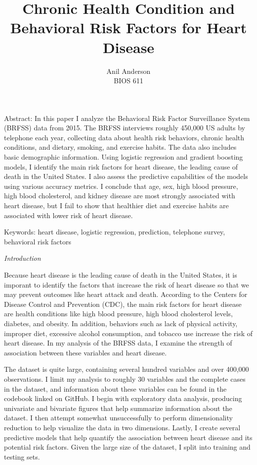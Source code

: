 \documentclass[12pt]{article}
\begin{document}
 
\title{Chronic Health Condition and Behavioral Risk Factors for Heart Disease}
\author{Anil Anderson\\
BIOS 611}
 
\maketitle

\noindent Abstract: In this paper I analyze the Behavioral Risk Factor Surveillance System (BRFSS) data from 2015. The BRFSS interviews roughly 450,000 US adults by telephone each year, collecting data about health risk behaviors, chronic health conditions, and dietary, smoking, and exercise habits. The data also includes basic demographic information. Using logistic regression and gradient boosting models, I identify the main risk factors for heart disease, the leading cause of death in the United States. I also assess the predictive capabilities of the models using various accuracy metrics. I conclude that age, sex, high blood pressure, high blood cholesterol, and kidney disease are most strongly associated with heart disease, but I fail to show that healthier diet and exercise habits are associated with lower risk of heart disease.

\medskip
\noindent Keywords: heart disease, logistic regression, prediction, telephone survey, behavioral risk factors
\medskip

\bigskip
\noindent \textit{Introduction}
\medskip

Because heart disease is the leading cause of death in the United States, it is imporant to identify the factors that increase the risk of heart disease so that we may prevent outcomes like heart attack and death. According to the Centers for Disease Control and Prevention (CDC), the main risk factors for heart disease are health conditions like high blood pressure, high blood cholesterol levels, diabetes, and obesity. In addition, behaviors such as lack of physical activity, improper diet, excessive alcohol consumption, and tobacco use increase the risk of heart disease. In my analysis of the BRFSS data, I examine the strength of association between these variables and heart disease.

The dataset is quite large, containing several hundred variables and over 400,000 observations. I limit my analysis to roughly 30 variables and the complete cases in the dataset, and information about these variables can be found in the codebook linked on GitHub. I begin with exploratory data analysis, producing univariate and bivariate figures that help summarize information about the dataset. I then attempt somewhat unsuccessfully to perform dimensionality reduction to help visualize the data in two dimensions. Lastly, I  create several predictive models that help quantify the association between heart disease and its potential risk factors. Given the large size of the dataset, I split into training and testing sets.
\end{document}
